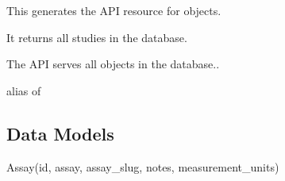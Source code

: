 \documentclass[letterpaper,10pt,english]{sphinxmanual}
\begin{document}

\begin{fulllineitems}
\label{data:mousedb.data.api.StudyResource}
This generates the API resource for {\hyperref[data:mousedb.data.models.Study]{}} objects.

It returns all studies in the database.

\begin{fulllineitems}
\label{data:mousedb.data.api.StudyResource.Meta}
The API serves all {\hyperref[data:mousedb.data.models.Study]{}} objects in the database..

\begin{fulllineitems}
\label{data:mousedb.data.api.StudyResource.Meta.object_class}
alias of 

\end{fulllineitems}


\end{fulllineitems}


\end{fulllineitems}



\subsection{Data Models}
\label{data:module-mousedb.data.models}\label{data:data-models}

\begin{fulllineitems}
\label{data:mousedb.data.models.Assay}
Assay(id, assay, assay\_slug, notes, measurement\_units)

\end{fulllineitems}

\end{document}
